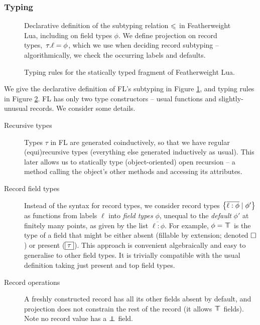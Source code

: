 \subsubsection{Typing}

\begin{figure}
    \centering
    
    \caption{Declarative definition of the subtyping relation $\leqslant$ in Featherweight Lua, including on field types $\phi$. We define projection on record types,~${\tau}{.}{\ell} = \phi$, which we use when deciding record subtyping -- algorithmically, we check the occurring labels and defaults.}
    \label{fig:featherweight-lua-subtyping}
\end{figure}

\begin{figure}
    
    \caption{Typing rules for the statically typed fragment of Featherweight Lua.}
    \label{fig:featherweight-lua-typing}
\end{figure}

We give the declarative definition of FL's subtyping in Figure \ref{fig:featherweight-lua-subtyping}, and typing rules in Figure \ref{fig:featherweight-lua-typing}.
FL has only two type constructors -- usual functions and slightly-unusual records. We consider some details.

\begin{description}
    \item[Recursive types] Types $\tau$ in FL are generated coinductively, so that we have regular (equi)recursive types (everything else generated inductively as usual). This later allows us to statically type (object-oriented) open recursion -- a method calling the object's other methods and accessing its attributes.
    \item[Record field types] Instead of the syntax for record types, we consider record types $\flrec{\overline{\ell : \phi} \mid \phi'}$ as functions from labels $\ell$ into \emph{field types} $\phi$, unequal to the \emph{default} $\phi'$ at finitely many points, as given by the list $\overline{\ell : \phi}$. For example, $\phi = \top \!\!\!\! \top$ is the type of a field that might be either absent (fillable by extension; denoted $\Box$) or present ($\boxed{\tau}$). This approach is convenient algebraically and easy to generalise to other field types. It is trivially compatible with the usual definition taking just present and top field types.
    \item[Record operations] A freshly constructed record has all its other fields absent by default, and projection does not constrain the rest of the record (it allows $\top \!\!\!\! \top$ fields). Note no record value has a $\bot \!\!\!\! \bot$ field.
\end{description}

